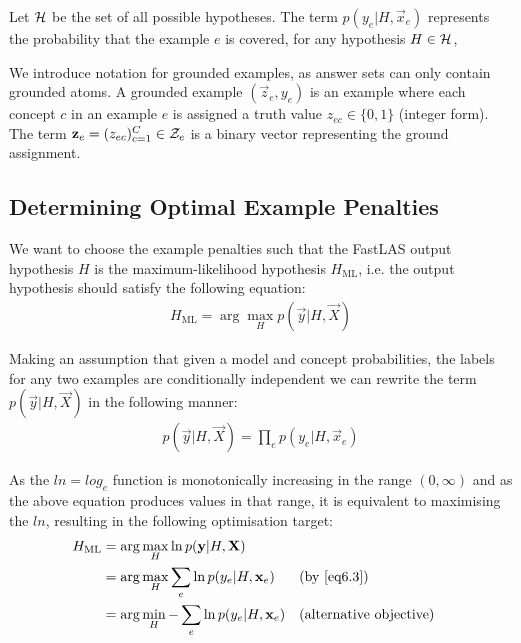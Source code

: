 Let $\curly{H}$ be the set of all possible hypotheses. The term $p(y_e|H, \vec{x}_{e})$ represents the probability that the example $e$ is covered, for any hypothesis $H \in \curly{H}$,


We introduce notation for grounded examples, as answer sets can only contain grounded atoms.
A grounded example $(\vec{z}_e, y_e)$ is an example where each concept $c$ in an example $e$ is assigned a truth value $z_{ec} \in \{0,1\}$ (integer form). 
The term $\vec{z}_e = (z_{ec})_{c=1}^C \in \curly{Z}_e$  is a binary vector representing the ground assignment. 

\subsection{Determining Optimal Example Penalties}

We want to choose the example penalties such that the FastLAS output hypothesis $H$ is the maximum-likelihood hypothesis $H_{\text{ML}}$, i.e. the output hypothesis should satisfy the following equation:
\begin{align}
H_{\text{ML}} = \arg\max_{H}
p(\vec{y}|H, \vec{X})
\end{align}

Making an assumption that given a model and concept probabilities, the labels for any two examples are conditionally independent we can rewrite the term $p(\vec{y}|H, \vec{X})$ in the following manner:
\begin{align}
p(\vec{y}|H, \vec{X})
= \prod_{e} p(y_e|H, \vec{x}_e) \label{eq6.3}
\end{align}


As the $ln = log_e$ function is monotonically increasing in the range $(0, \infty)$ and as the above equation produces values in that range, it is equivalent to maximising the $ln$, resulting in the following optimisation target:
\begin{align}
H_{\text{ML}}
& = \arg\max_{H}
\ln p(\vec{y}|H, \vec{X}) \nonumber \\
& = \arg\max_{H}
\sum_{e} \ln p(y_e|H, \vec{x}_e) && \text{(by \ref{eq6.3})} \nonumber \\
& = \arg\min_{H}
-\sum_{e} \ln p(y_e|H, \vec{x}_e) && \text{(alternative objective)} \label{ex6.4}
\end{align}


